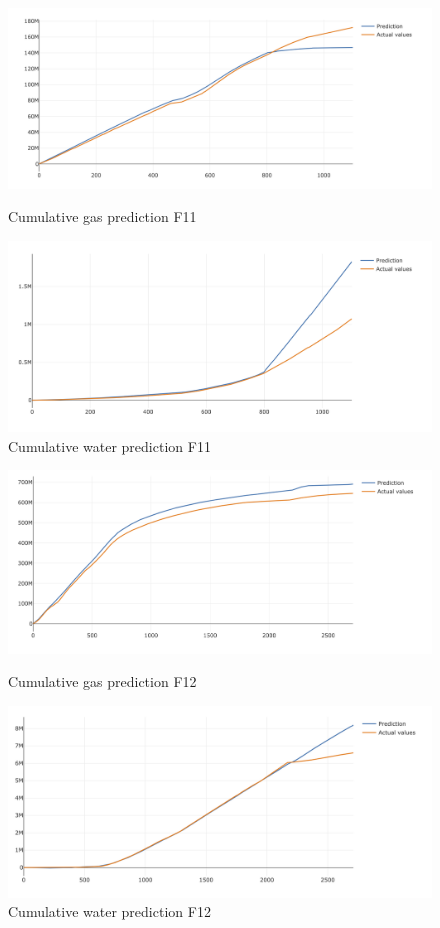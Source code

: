\documentclass[12pt,a4paper]{report}
\begin{document}
\begin{figure}[H]
  \includegraphics[width=\linewidth]{LSTM_gas_water/F11_gas}
  \caption{Cumulative gas prediction F11}\label{fig:awesome_image1}
\endminipage\hfill
{}
  \includegraphics[width=\linewidth]{LSTM_gas_water/F11_water}
  \caption{Cumulative water prediction F11}\label{fig:awesome_image2}
\endminipage\hfill
\end{figure}

\begin{figure}[H]
  \includegraphics[width=\linewidth]{LSTM_gas_water/F12_gas}
  \caption{Cumulative gas prediction F12}\label{fig:awesome_image1}
\endminipage\hfill
{}
  \includegraphics[width=\linewidth]{LSTM_gas_water/F12_water}
  \caption{Cumulative water prediction F12}\label{fig:awesome_image2}
\endminipage\hfill
\end{figure}
\end{document}
